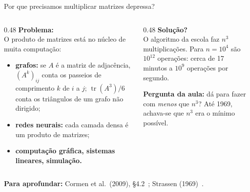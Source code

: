 \documentclass[aspectratio=169,xcolor=table]{beamer}
\newcommand{\fonte}[1]{%
  \vfill
  {\tiny\color{gray!55!black}\textbf{Para aprofundar:} #1\par}%
}
\begin{document}
\begin{frame}{Por que precisamos multiplicar matrizes depressa?}
  \begin{columns}[T]
    \begin{column}{0.48\textwidth}
      \textbf{Problema:}\\[2pt]
      \scriptsize O produto de matrizes está no núcleo de muita computação:
      \begin{itemize}\scriptsize
        \item \textbf{grafos:} se $A$ é a matriz de adjacência, $(A^k)_{ij}$ conta os
              passeios de comprimento $k$ de $i$ a $j$; $\operatorname{tr}(A^3)/6$ conta os
              triângulos de um grafo não dirigido;
        \item \textbf{redes neurais:} cada camada densa é um produto de matrizes;
        \item \textbf{computação gráfica, sistemas lineares, simulação.}
      \end{itemize}
    \end{column}
    \begin{column}{0.48\textwidth}
      \textbf{Solução?}\\[2pt]
      \scriptsize O algoritmo da escola faz $n^3$ multiplicações.
      Para $n=10^4$ são $10^{12}$ operações: cerca de 17 minutos a $10^9$ operações por
      segundo.
      \medskip

      \textbf{Pergunta da aula:} dá para fazer com \emph{menos} que $n^3$?
      Até 1969, achava-se que $n^3$ era o mínimo possível.
    \end{column}
  \end{columns}
  \fonte{Cormen et al.\ (2009), \S 4.2~\cite{cormen2009introduction};
    Strassen (1969)~\cite{strassen1969gaussian}.}
\end{frame}
\end{document}
